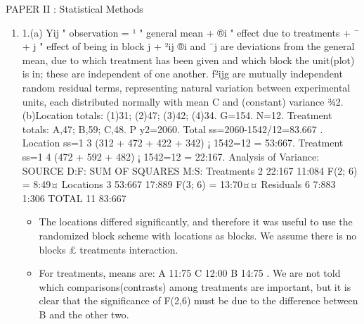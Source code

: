 \documentclass[a4paper,12pt]{article}
\begin{document}
PAPER II : Statistical Methods
\begin{enumerate}
\item 1.(a) Yij
"
observation
= ¹
"
general mean
+ ®i
"
effect
due to
treatments
+ ¯ + j
"
effect of
being in
block j
+ ²ij
®i and ¯j are deviations from the general mean, due to which treatment has been given and
which block the unit(plot) is in; these are independent of one another.
f²ijg are mutually independent random residual terms, representing natural variation between
experimental units, each distributed normally with mean C and (constant) variance ¾2.
(b)Location totals: (1)31; (2)47; (3)42; (4)34. G=154. N=12.
Treatment totals: A,47; B,59; C,48.
P
y2=2060.
Total ss=2060-1542/12=83.667 .
Location ss=1
3 (312 + 472 + 422 + 342) ¡ 1542=12 = 53:667.
Treatment ss=1
4 (472 + 592 + 482) ¡ 1542=12 = 22:167.
Analysis of Variance:
SOURCE D:F: SUM OF SQUARES M:S:
Treatments 2 22:167 11:084 F(2; 6) = 8:49¤
Locations 3 53:667 17:889 F(3; 6) = 13:70¤¤
Residuals 6 7:883 1:306
TOTAL 11 83:667

\begin{itemize}
    \item The locations differed significantly, and therefore it was useful to use the randomized block scheme
with locations as blocks. We assume there is no blocks £ treatments interaction.
\item  For treatments, means are: A 11:75
C 12:00
B 14:75
. We are not told which comparisons(contrasts) among
treatments are important, but it is clear that the significance of F(2,6) must be due to the difference
between B and the other two.
\end{itemize}


\end{enumerate}
\end{document}
